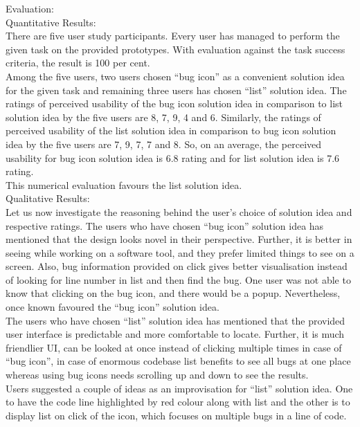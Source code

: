 Evaluation: \\

Quantitative Results: \\

There are five user study participants. Every user has managed to perform the given task on the provided prototypes. With evaluation against the task success criteria, the result is 100 per cent. \\

Among the five users, two users chosen “bug icon” as a convenient solution idea for the given task and remaining three users has chosen “list” solution idea. The ratings of perceived usability of the bug icon solution idea in comparison to list solution idea by the five users are 8, 7, 9, 4 and 6. Similarly, the ratings of perceived usability of the list solution idea in comparison to bug icon solution idea by the five users are 7, 9, 7, 7 and 8. So, on an average, the perceived usability for bug icon solution idea is 6.8 rating and for list solution idea is 7.6 rating. \\

This numerical evaluation favours the list solution idea. \\

Qualitative Results: \\

Let us now investigate the reasoning behind the user’s choice of solution idea and respective ratings. The users who have chosen “bug icon” solution idea has mentioned that the design looks novel in their perspective. Further, it is better in seeing while working on a software tool, and they prefer limited things to see on a screen. Also, bug information provided on click gives better visualisation instead of looking for line number in list and then find the bug. One user was not able to know that clicking on the bug icon, and there would be a popup. Nevertheless, once known favoured the “bug icon” solution idea. \\

The users who have chosen “list” solution idea has mentioned that the provided user interface is predictable and more comfortable to locate. Further, it is much friendlier UI, can be looked at once instead of clicking multiple times in case of “bug icon”, in case of enormous codebase list benefits to see all bugs at one place whereas using bug icons needs scrolling up and down to see the results. \\

Users suggested a couple of ideas as an improvisation for “list” solution idea. One to have the code line highlighted by red colour along with list and the other is to display list on click of the icon, which focuses on multiple bugs in a line of code. \\


